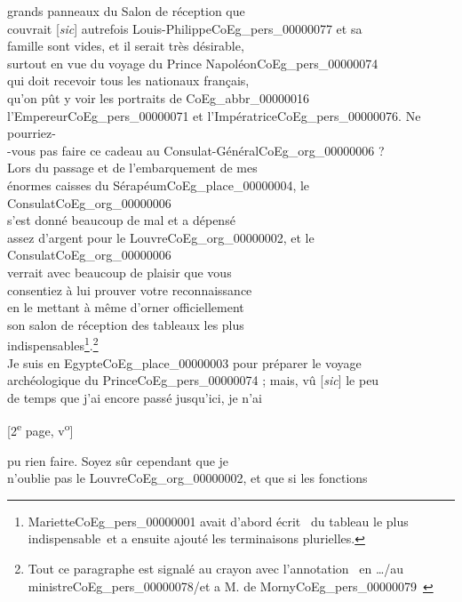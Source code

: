 \documentclass{book}
\begin{document}
grands panneaux du Salon de réception que\\
couvrait {[\textit{sic}]} autrefois Louis-Philippe\gls{CoEg_pers_00000077} et sa\\
famille sont vides, et il serait très désirable,\\
surtout en vue du voyage du Prince Napoléon\gls{CoEg_pers_00000074}\\
qui doit recevoir tous les nationaux français,\\
qu’on pût y voir les portraits de \gls{CoEg_abbr_00000016}\\
l’Empereur\gls{CoEg_pers_00000071} et l’Impératrice\gls{CoEg_pers_00000076}. Ne pourriez-\\
-vous pas faire ce cadeau au Consulat-Général\gls{CoEg_org_00000006} ?\\
\indent Lors du passage et de l’embarquement de mes\\
énormes caisses du Sérapéum\gls{CoEg_place_00000004}, le Consulat\gls{CoEg_org_00000006}\\
s’est donné beaucoup de mal et a dépensé\\
assez d’argent pour le Louvre\gls{CoEg_org_00000002}, et le Consulat\gls{CoEg_org_00000006}\\
verrait avec beaucoup de plaisir que vous\\
consentiez à lui prouver votre reconnaissance\\
en le mettant à même d’orner officiellement\\
son salon de réception des tableaux les plus\\
indispensables\footnote{Mariette\gls{CoEg_pers_00000001} avait d'abord écrit \og ~du tableau le plus indispensable~\fg et a ensuite ajouté les terminaisons plurielles.}.\footnote{Tout ce paragraphe est signalé au crayon avec l'annotation \og ~en …/au ministre\gls{CoEg_pers_00000078}/et a M. de Morny\gls{CoEg_pers_00000079}~\fg}\\
\indent Je suis en Egypte\gls{CoEg_place_00000003} pour préparer le voyage\\
archéologique du Prince\gls{CoEg_pers_00000074} ; mais, vû {[\textit{sic}]} le peu\\
de temps que j’ai encore passé jusqu’ici, je n’ai
{\footnotesize\begin{center} {[2\textsuperscript{e} page, v\textsuperscript{o}]}\end{center}}
\noindent pu rien faire. Soyez sûr cependant que je\\
n’oublie pas le Louvre\gls{CoEg_org_00000002}, et que si les fonctions\\
\end{document}
